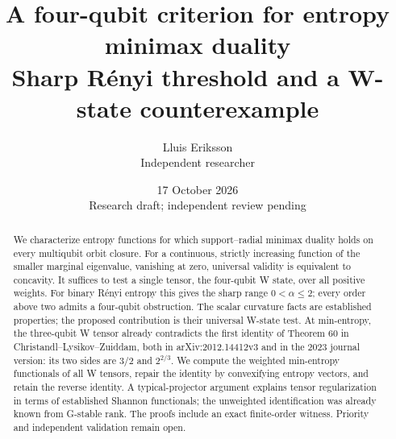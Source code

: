 \documentclass[11pt,a4paper]{article}
\title{A four-qubit criterion for entropy minimax duality\\
\large Sharp R\'enyi threshold and a W-state counterexample}
\author{Lluis Eriksson\\ \small Independent researcher}
\date{17 October 2026\\ \small Research draft; independent review pending}
\begin{document}
\maketitle
\begin{abstract}
We characterize entropy functions for which support--radial minimax
duality holds on every multiqubit orbit closure. For a continuous,
strictly increasing function of the smaller marginal eigenvalue,
vanishing at zero, universal validity is equivalent to concavity.
It suffices to test a single tensor, the four-qubit W state, over all
positive weights. For binary R\'enyi entropy this gives the sharp
range \(0<\alpha\le2\); every order above two admits a four-qubit
obstruction. The scalar curvature facts are established properties;
the proposed contribution is their universal W-state test.
At min-entropy, the three-qubit W tensor already contradicts the first
identity of Theorem 60 in Christandl--Lysikov--Zuiddam,
both in arXiv:2012.14412v3 and in the 2023 journal version:
its two sides are \(3/2\) and \(2^{2/3}\).
We compute the weighted min-entropy functionals of all W tensors,
repair the identity by convexifying entropy vectors, and retain the
reverse identity. A typical-projector argument explains tensor
regularization in terms of established Shannon functionals; the
unweighted identification was already known from G-stable rank.
The proofs include an exact finite-order witness. Priority and
independent validation remain open.
\end{abstract}
\end{document}
